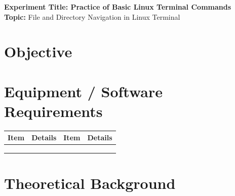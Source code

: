 \documentclass[10pt,a4paper]{article}
\begin{document}
\thispagestyle{firstpage}

\begin{center}
  {\Large\bfseries\sffamily\color{primary} Experiment Title: Practice of Basic Linux Terminal Commands}\\[3pt]
  {\normalsize\sffamily\textbf{Topic:} File and Directory Navigation in Linux Terminal}
\end{center}
\vspace{2pt}

\section{Objective}
\vspace*{3.2cm}

\section{Equipment / Software Requirements}
\vspace{-2pt}
\begin{table}[h!]
\centering\footnotesize
\renewcommand{\arraystretch}{1.5}
\begin{tabularx}{\linewidth}{|p{3.2cm}|X|p{3.2cm}|X|}
\hline
\textbf{Item} & \textbf{Details} & \textbf{Item} & \textbf{Details} \\
\hline
\rule{0pt}{14pt} & & & \\ \hline
\rule{0pt}{14pt} & & & \\ \hline
\rule{0pt}{14pt} & & & \\ \hline
\end{tabularx}
\end{table}
\vspace{-6pt}

\section{Theoretical Background}
\vspace*{1.2cm}
\end{document}
